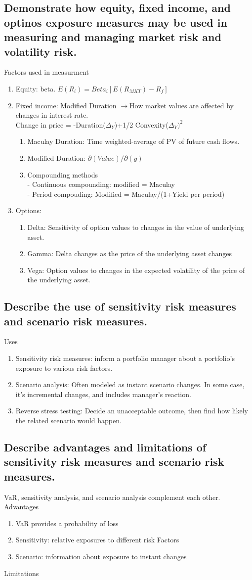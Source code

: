 \documentclass{article}
\newcommand{\be}{\begin{enumerate}}
\newcommand{\ee}{\end{enumerate}}
\newcommand{\ra}{$\rightarrow$}
\begin{document}
\subsection{Demonstrate how equity, fixed income, and optinos exposure measures may be 
used in measuring and managing market risk and volatility risk.}
Factors used in measurment
\be
    \item Equity: beta. $E(R_i) = Beta_i[E(R_{MKT})-R_f]$
    \item Fixed income: Modified Duration \ra How market values are affected by changes in interest rate.
        \\ Change in price = -Duration($\Delta_Y$)+1/2 Convexity($\Delta_Y)^2$
        \be
            \item Maculay Duration: Time weighted-average of PV of future cash flows.
            \item Modified Duration: $\partial(Value)/\partial(y)$
            \item Compounding methods
            \\  -  Continuous compounding: modified = Maculay
            \\  -  Period compouding: Modified = Maculay/(1+Yield per period)
        \ee
    \item Options: 
        \be
            \item Delta: Sensitivity of option values to changes in the value of underlying asset. 
            \item Gamma: Delta changes as the price of the underlying asset changes
            \item Vega: Option values to changes in the expected volatility of the price of the underlying asset.
        \ee
\ee
\subsection{Describe the use of sensitivity risk measures and scenario risk measures.}
Uses
\be
    \item Sensitivity risk measures: inform a portfolio manager about a portfolio's exposure to
    various risk factors.
    \item Scenario analysis: Often modeled as instant scenario changes. In some case, it's incremental
    changes, and includes manager's reaction.
    \item Reverse stress testing: Decide an unacceptable outcome, then find how likely the related scenario
    would happen. 
\ee
\subsection{Describe advantages and limitations of sensitivity risk measures and scenario risk measures.}
VaR, sensitivity analysis, and scenario analysis complement each other.\\
Advantages
\be
    \item VaR provides a probability of loss
    \item Sensitivity: relative exposures to different risk Factors
    \item Scenario: information about exposure to instant changes
\ee
Limitations
\end{document}
